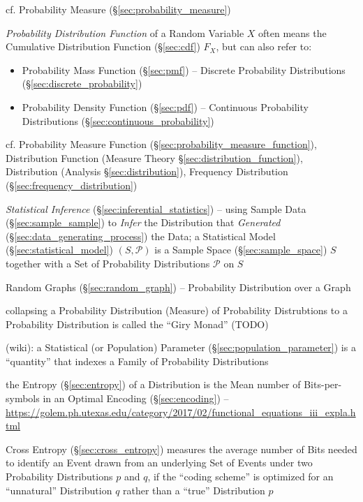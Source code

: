 cf. Probability Measure (\S\ref{sec:probability_measure})

\emph{Probability Distribution Function} of a Random Variable $X$ often means
the Cumulative Distribution Function (\S\ref{sec:cdf}) $F_X$, but can also refer
to:
\begin{itemize}
  \item Probability Mass Function (\S\ref{sec:pmf}) -- Discrete Probability
    Distributions (\S\ref{sec:discrete_probability})
  \item Probability Density Function (\S\ref{sec:pdf}) -- Continuous Probability
    Distributions (\S\ref{sec:continuous_probability})
\end{itemize}

\fist cf. Probability Measure Function
(\S\ref{sec:probability_measure_function}), Distribution Function (Measure
Theory \S\ref{sec:distribution_function}), Distribution (Analysis
\S\ref{sec:distribution}), Frequency Distribution
(\S\ref{sec:frequency_distribution})

\fist \emph{Statistical Inference} (\S\ref{sec:inferential_statistics}) -- using
Sample Data (\S\ref{sec:sample_sample}) to \emph{Infer} the Distribution
that \emph{Generated} (\S\ref{sec:data_generating_process}) the Data; a
Statistical Model (\S\ref{sec:statistical_model}) $(S,\mathcal{P})$ is a Sample
Space (\S\ref{sec:sample_space}) $S$ together with a Set of Probability
Distributions $\mathcal{P}$ on $S$

\fist Random Graphs (\S\ref{sec:random_graph}) -- Probability Distribution over
a Graph

collapsing a Probability Distribution (Measure) of Probability Distrubtions to a
Probability Distribution is called the ``Giry Monad'' (TODO)

(wiki): a Statistical (or Population) Parameter
(\S\ref{sec:population_parameter}) is a ``quantity'' that indexes a Family of
Probability Distributions

the Entropy (\S\ref{sec:entropy}) of a Distribution is the Mean number
of Bits-per-symbols in an Optimal Encoding (\S\ref{sec:encoding}) --
\url{https://golem.ph.utexas.edu/category/2017/02/functional_equations_iii_expla.html}

Cross Entropy (\S\ref{sec:cross_entropy}) measures the average number of Bits
needed to identify an Event drawn from an underlying Set of Events under two
Probability Distributions $p$ and $q$, if the ``coding scheme'' is optimized for
an ``unnatural'' Distribution $q$ rather than a ``true'' Distribution $p$

